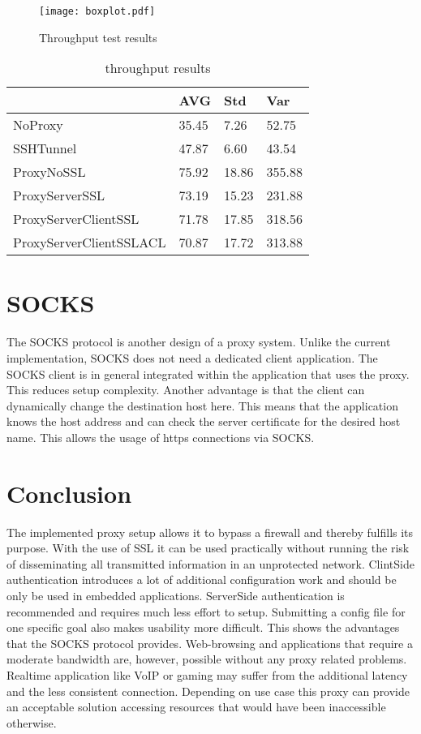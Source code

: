 \documentclass[12pt, a4paper]{scrartcl}
\begin{document}
\begin{figure}[]
    \centering
    \texttt{[image: boxplot.pdf]}
    \caption{Throughput test results}\label{fig::boxres}
\end{figure}
\begin{table}[]
    \centering
    \begin{tabular}{|l|l|l|l|}
    \hline
                            & AVG   & Std   & Var    \\ \hline
    NoProxy                 & 35.45 & 7.26  & 52.75  \\ \hline
    SSHTunnel               & 47.87 & 6.60  & 43.54  \\ \hline
    ProxyNoSSL              & 75.92 & 18.86 & 355.88 \\ \hline
    ProxyServerSSL          & 73.19 & 15.23 & 231.88 \\ \hline
    ProxyServerClientSSL    & 71.78 & 17.85 & 318.56 \\ \hline
    ProxyServerClientSSLACL & 70.87 & 17.72 & 313.88 \\ \hline
    \end{tabular}
    \caption{ throughput results}\label{tab::vals}
    \end{table}

\section{SOCKS}
The SOCKS protocol is another design of a proxy system. Unlike the current implementation, SOCKS does not need a dedicated client application. The SOCKS client is in general integrated within the application that uses the proxy. This reduces setup complexity. Another advantage is that the client can dynamically change the destination host here. This means that the application knows the host address and can check the server certificate for the desired host name. This allows the usage of https connections via SOCKS.

\section{Conclusion}
The implemented proxy setup allows it to bypass a firewall and thereby fulfills its purpose. With the use of \ac{SSL} it can be used practically without running the risk of disseminating all transmitted information in an unprotected network. ClintSide authentication introduces a lot of additional configuration work and should be only be used in embedded applications. ServerSide authentication is recommended and requires much less effort to setup.\newline
Submitting a config file for one specific goal also makes usability more difficult. This shows the advantages that the SOCKS protocol provides. Web-browsing and applications that require a moderate bandwidth are, however, possible without any proxy related problems. Realtime application like \ac{VoIP} or gaming may suffer from the additional latency and the less consistent connection.\newline
Depending on use case this proxy can provide an acceptable solution accessing resources that would have been inaccessible otherwise.
\end{document}
